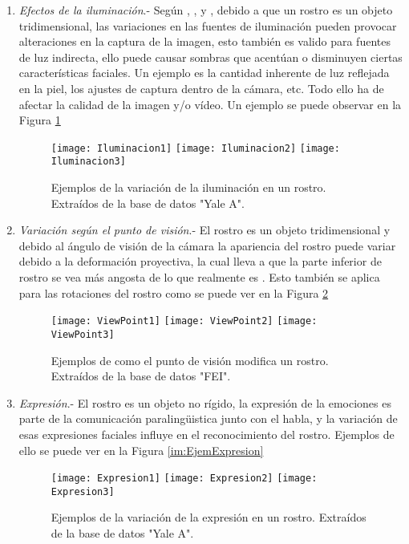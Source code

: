 \begin{enumerate}%
\item \textit{Efectos de la iluminación}.- Según \citep{kalocsai1998face}, \citep{johnston1992recognising}, \citep{bruce1998human} y \citep{hill1996effects}, debido a que un rostro es un objeto tridimensional, las variaciones en las fuentes de iluminación pueden provocar alteraciones en la captura de la imagen, esto también es valido para fuentes de luz indirecta, ello puede causar sombras que acentúan o disminuyen ciertas características faciales. Un ejemplo es la cantidad inherente de luz reflejada en la piel, los ajustes de captura dentro de la cámara, etc. Todo ello ha de afectar la calidad de la imagen y/o vídeo. Un ejemplo se puede observar en la Figura \ref{im:EjemIluminacion}
\begin{figure}[h]
\center
\texttt{[image: Iluminacion1]}
\texttt{[image: Iluminacion2]}
\texttt{[image: Iluminacion3]}
\caption{Ejemplos de la variación de la iluminación en un rostro. Extraídos de la base de datos "Yale A".}
\label{im:EjemIluminacion}
\end{figure}
\item \textit{Variación según el punto de visión}.- El rostro es un objeto tridimensional y debido al ángulo de visión de la cámara la apariencia del rostro puede variar debido a la deformación proyectiva, la cual lleva a que la parte inferior de rostro se vea más angosta de lo que realmente es \citep{hill1997information}. Esto también se aplica para las rotaciones del rostro como se puede ver en la Figura \ref{im:EjemViewPoint}
\begin{figure}[h]
\center
\texttt{[image: ViewPoint1]}
\texttt{[image: ViewPoint2]}
\texttt{[image: ViewPoint3]}
\caption{Ejemplos de como el punto de visión modifica un rostro. Extraídos de la base de datos "FEI".}
\label{im:EjemViewPoint}
\end{figure}
\item \textit{Expresión}.-  El rostro es un objeto no rígido, la expresión de la emociones es parte de la comunicación paralingüistica junto con el habla, y la variación de esas expresiones faciales influye en el reconocimiento del rostro. Ejemplos de ello se puede ver en la Figura \ref{im:EjemExpresion}
\begin{figure}[h]
\center
\texttt{[image: Expresion1]}
\texttt{[image: Expresion2]}
\texttt{[image: Expresion3]}
\caption{Ejemplos de la variación de la expresión en un rostro. Extraídos de la base de datos "Yale A".}

\end{figure}
\end{enumerate}
